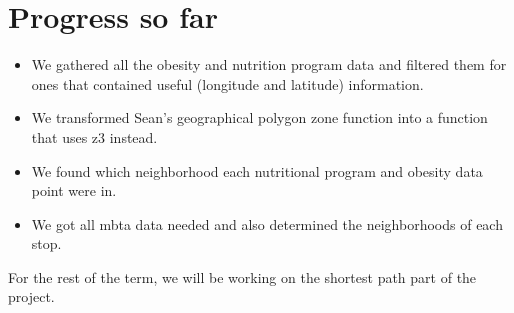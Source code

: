 \documentclass[12pt]{article}
\begin{document}
\section{Progress so far}
\begin{itemize}
\item We gathered all the obesity and nutrition program data and filtered them for ones that contained useful (longitude and latitude) information.
\item We transformed Sean's geographical polygon zone function into a function that uses z3 instead.
\item We found which neighborhood each nutritional program and obesity data point were in.
\item We got all mbta data needed and also determined the neighborhoods of each stop.
\end{itemize}

For the rest of the term, we will be working on the shortest path part of the project. 
\end{document}
